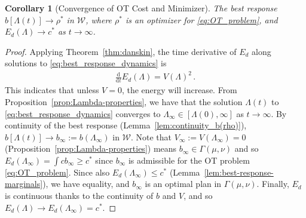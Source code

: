 \documentclass[11pt,a4paper,final]{article}
\newcommand{\cov}{\mathrm{Cov}}
\newcommand{\Wass}{\mathscr{W}}
\newcommand{\mb}{\mathbb}
\DeclareMathOperator*{\E}{\mb{E}}
\renewcommand{\d}{\mathrm{d}}
\newcommand{\ddt}{\frac{\d}{\d t}}
\newcommand{\1}{\mathbf{1}}
\theoremstyle{plain}
\newtheorem{corollary}[theorem]{Corollary}
\numberwithin{equation}{section}
\numberwithin{theorem}{section}
\begin{document}
\begin{corollary}[Convergence of OT Cost and Minimizer]
 The best response $b[\Lambda(t)]\rightarrow\rho^*$ in $\Wass$, where $\rho^*$ is an optimizer for  \eqref{eq:OT_problem}, and $E_d(\Lambda)\rightarrow c^*$ as $t\rightarrow \infty$.
\end{corollary}
\begin{proof}
    Applying Theorem~\ref{thm:danskin}, the time derivative of $E_d$ along solutions to \eqref{eq:best_response_dynamics} is
\begin{align*}
    \ddt E_d(\Lambda) = V(\Lambda)^2\,.
\end{align*}
This indicates that unless $V=0$, the energy will increase. 
From Proposition~\ref{prop:Lambda-properties}, we have that the solution $\Lambda(t)$ to \eqref{eq:best_response_dynamics} converges to $\Lambda_\infty\in [\Lambda(0),\infty]$ as $t\to\infty$.  By continuity of the best response (Lemma~\ref{lem:continuity_b(rho)}), $b[\Lambda(t)]\to b_\infty:=b(\Lambda_\infty)$ in $\Wass$. Note that $V_\infty:=V(\Lambda_\infty)=0$ (Proposition~\ref{prop:Lambda-properties}) means $b_\infty\in\Gamma(\mu, \nu)$
and so $E_d(\Lambda_\infty)=\int c b_\infty \ge c^*$ since $b_\infty$ is admissible for the OT problem \eqref{eq:OT_problem}. Since also $E_d(\Lambda_\infty)\le c^*$ (Lemma~\ref{lem:best-response-marginals}), we have equality, and $b_\infty$ is an optimal plan in $\Gamma(\mu, \nu)$. Finally, $E_d$ is continuous thanks to the continuity of $b$ and $V$, and so $E_d(\Lambda)\rightarrow E_d(\Lambda_\infty)=c^*$. 
\end{proof}
\end{document}
